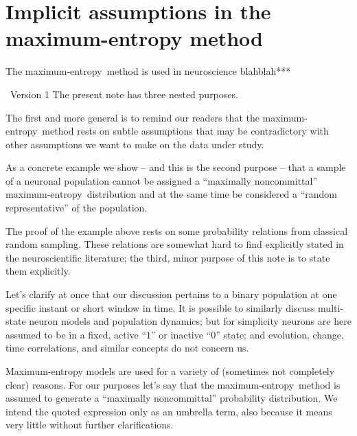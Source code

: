\documentclass{article}
\title{\pdftitle}
\author{ V. Rostami\\
  Forschungszentrum Jülich INM-6\\Hitlerland\\
  \texttt{v.rostami@fz-juelich.de}
  \And
  P.G.L. Porta Mana\\Mussoliniland
  \And E. Torre\\Moneylaunderingland  
}
\theoremstyle{remark}
\theoremstyle{innote}
\newcommand*{\citep}{\parencites}
\renewcommand*{\cite}{\citep}
\renewcommand*{\|}{\mathpunct{|}}%
\theoremstyle{simple}
\newcommand*{\puzzle}{{\fontencoding{U}\fontfamily{fontawesometwo}\selectfont\symbol{225}}}
\newcommand*{\mynote}[1]{ {\color{notecolour}\puzzle\ #1}}
\newcommand*{\me}{maximum-entropy}
\begin{document}

\maketitle

\begin{abstract}
  ***%
\end{abstract}

\section{Implicit assumptions in the maximum-entropy method}

The \me\ method is used in neuroscience blahblah***

\mynote{Version 1}
The present note has three nested purposes.

The first and more general is to remind our readers that the \me\ method
rests on subtle assumptions that may be contradictory with other
assumptions we want to make on the data under study.

As a concrete example we show -- and this is the second purpose -- that a
sample of a neuronal population cannot be assigned a \enquote{maximally
  noncommittal} \me\ distribution and at the same time be considered a
\enquote{random representative} of the population.

The proof of the example above rests on some probability relations from
classical random sampling. These relations are somewhat hard to find
explicitly stated in the neuroscientific literature; the third, minor
purpose of this note is to state them explicitly.


Let's clarify at once that our discussion pertains to a binary population at
one specific instant or short window in time. It is possible to
similarly discuss multi-state neuron models and population dynamics; but for
simplicity neurons are here assumed to be in a fixed, active \enquote{$1$}
or inactive \enquote{$0$} state; and evolution, change, time correlations,
and similar concepts do not concern us.


Maximum-entropy models are used for a variety of (sometimes not completely
clear) reasons. For our purposes let's say that the \me\ method is assumed
to generate a \enquote{maximally noncommittal} \cite{jaynes1963} probability
distribution. We intend the quoted expression only as an umbrella term,
also because it means very little without further clarifications.
\end{document}
